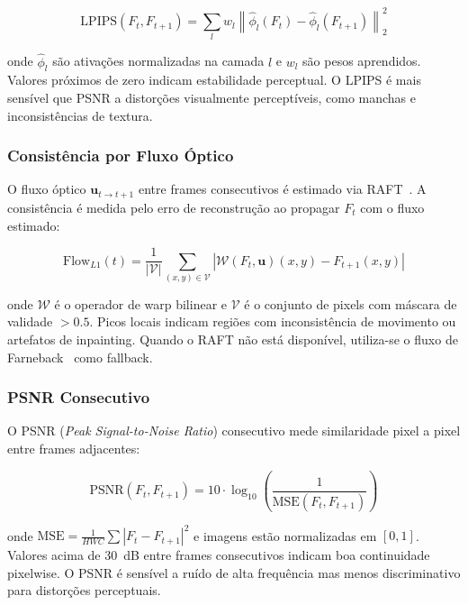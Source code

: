 \documentclass[conference]{IEEEtran}
\begin{document}
\begin{equation}
    \mathrm{LPIPS}(F_t, F_{t+1}) = \sum_l w_l \left\| \hat{\phi}_l(F_t) - \hat{\phi}_l(F_{t+1}) \right\|_2^2
\label{eq:lpips}
\end{equation}

onde $\hat{\phi}_l$ são ativações normalizadas na camada $l$ e $w_l$ são pesos aprendidos. Valores próximos de zero indicam estabilidade perceptual. O LPIPS é mais sensível que PSNR a distorções visualmente perceptíveis, como manchas e inconsistências de textura.

\subsubsection{Consistência por Fluxo Óptico}

O fluxo óptico $\mathbf{u}_{t \to t+1}$ entre frames consecutivos é estimado via RAFT~\cite{raft}. A consistência é medida pelo erro de reconstrução ao propagar $F_t$ com o fluxo estimado:

\begin{equation}
    \mathrm{Flow}_{L1}(t) = \frac{1}{\lvert\mathcal{V}\rvert} \sum_{(x,y) \in \mathcal{V}} \left| \mathcal{W}(F_t, \mathbf{u})(x,y) - F_{t+1}(x,y) \right|
\label{eq:flow}
\end{equation}

onde $\mathcal{W}$ é o operador de warp bilinear e $\mathcal{V}$ é o conjunto de pixels com máscara de validade $> 0.5$. Picos locais indicam regiões com inconsistência de movimento ou artefatos de inpainting. Quando o RAFT não está disponível, utiliza-se o fluxo de Farneback~\cite{szeliski} como fallback.

\subsubsection{PSNR Consecutivo}

O PSNR (\textit{Peak Signal-to-Noise Ratio}) consecutivo mede similaridade pixel a pixel entre frames adjacentes:

\begin{equation}
    \mathrm{PSNR}(F_t, F_{t+1}) = 10 \cdot \log_{10}\!\left(\frac{1}{\mathrm{MSE}(F_t, F_{t+1})}\right)
\label{eq:psnr}
\end{equation}

onde $\mathrm{MSE} = \frac{1}{HWC}\sum|F_t - F_{t+1}|^2$ e imagens estão normalizadas em $[0,1]$. Valores acima de 30~dB entre frames consecutivos indicam boa continuidade pixelwise. O PSNR é sensível a ruído de alta frequência mas menos discriminativo para distorções perceptuais.
\end{document}
